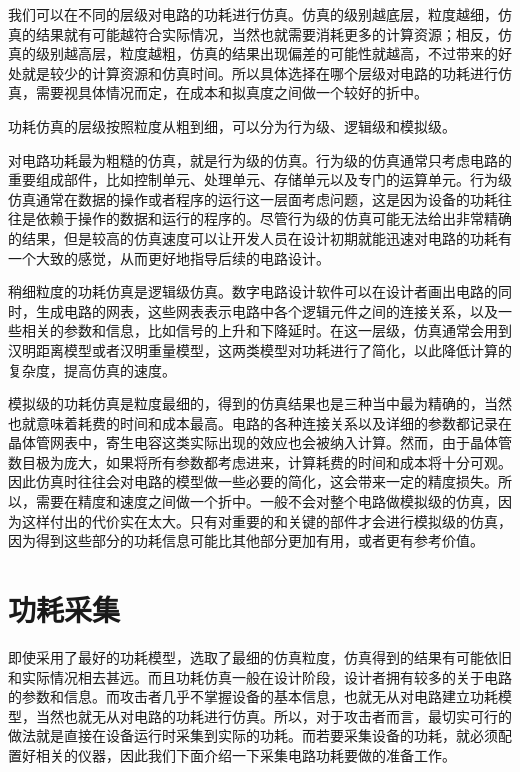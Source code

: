我们可以在不同的层级对电路的功耗进行仿真。仿真的级别越底层，粒度越细，仿真的结果就有可能越符合实际情况，当然也就需要消耗更多的计算资源；相反，仿真的级别越高层，粒度越粗，仿真的结果出现偏差的可能性就越高，不过带来的好处就是较少的计算资源和仿真时间。所以具体选择在哪个层级对电路的功耗进行仿真，需要视具体情况而定，在成本和拟真度之间做一个较好的折中。

功耗仿真的层级按照粒度从粗到细，可以分为行为级、逻辑级和模拟级。

对电路功耗最为粗糙的仿真，就是行为级的仿真。行为级的仿真通常只考虑电路的重要组成部件，比如控制单元、处理单元、存储单元以及专门的运算单元。行为级仿真通常在数据的操作或者程序的运行这一层面考虑问题，这是因为设备的功耗往往是依赖于操作的数据和运行的程序的。尽管行为级的仿真可能无法给出非常精确的结果，但是较高的仿真速度可以让开发人员在设计初期就能迅速对电路的功耗有一个大致的感觉，从而更好地指导后续的电路设计。

稍细粒度的功耗仿真是逻辑级仿真。数字电路设计软件可以在设计者画出电路的同时，生成电路的网表，这些网表表示电路中各个逻辑元件之间的连接关系，以及一些相关的参数和信息，比如信号的上升和下降延时。在这一层级，仿真通常会用到汉明距离模型或者汉明重量模型，这两类模型对功耗进行了简化，以此降低计算的复杂度，提高仿真的速度。

模拟级的功耗仿真是粒度最细的，得到的仿真结果也是三种当中最为精确的，当然也就意味着耗费的时间和成本最高。电路的各种连接关系以及详细的参数都记录在晶体管网表中，寄生电容这类实际出现的效应也会被纳入计算。然而，由于晶体管数目极为庞大，如果将所有参数都考虑进来，计算耗费的时间和成本将十分可观。因此仿真时往往会对电路的模型做一些必要的简化，这会带来一定的精度损失。所以，需要在精度和速度之间做一个折中。一般不会对整个电路做模拟级的仿真，因为这样付出的代价实在太大。只有对重要的和关键的部件才会进行模拟级的仿真，因为得到这些部分的功耗信息可能比其他部分更加有用，或者更有参考价值。

\section{功耗采集} %
即使采用了最好的功耗模型，选取了最细的仿真粒度，仿真得到的结果有可能依旧和实际情况相去甚远。而且功耗仿真一般在设计阶段，设计者拥有较多的关于电路的参数和信息。而攻击者几乎不掌握设备的基本信息，也就无从对电路建立功耗模型，当然也就无从对电路的功耗进行仿真。所以，对于攻击者而言，最切实可行的做法就是直接在设备运行时采集到实际的功耗。而若要采集设备的功耗，就必须配置好相关的仪器，因此我们下面介绍一下采集电路功耗要做的准备工作。

\vspace*{\baselineskip}

